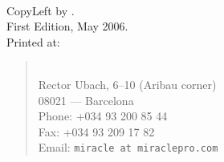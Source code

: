 
\ \vskip 1cm %

{\avantgarbold\noindent CopyLeft }{ by \thyauthor.} \\[3ex]

{\avantgarbold\noindent First Edition}{\avantgar, May 2006.} \\[3ex]

{\avantgarbold\noindent Printed at:}
\begin{quotation}%
	\avantgar%
	 \\
	Rector Ubach, 6--10 (Aribau corner) \\
	08021 --- Barcelona \\
	Phone: +034 93 200 85 44 \\
      Fax: +034 93 209 17 82 \\
    Email: \texttt{miracle at miraclepro.com} \\
\end{quotation}%

